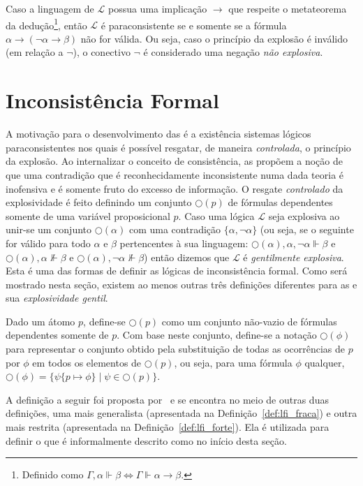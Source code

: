     Caso a linguagem de $\mathcal{L}$ possua uma implicação $\to$ que respeite o metateorema da dedução\footnote{Definido como $\Gamma, \alpha \Vdash \beta \Longleftrightarrow  \Gamma\Vdash \alpha \to \beta$.}, então $\mathcal{L}$ é paraconsistente se e somente se a fórmula $\alpha \to (\neg \alpha \to \beta)$ não for válida. Ou seja, caso o princípio da explosão é inválido (em relação a $\neg$), o conectivo $\neg$ é considerado uma negação \textit{não explosiva}.

\section{Inconsistência Formal}\label{sec:incons}
    A motivação para o desenvolvimento das \lfis{} é a existência sistemas lógicos paraconsistentes nos quais é possível resgatar, de maneira \textit{controlada}, o princípio da explosão. Ao internalizar o conceito de consistência, as \lfis{} propõem a noção de que uma contradição que é reconhecidamente inconsistente numa dada teoria é inofensiva e é somente fruto do excesso de informação. O resgate \textit{controlado} da explosividade é feito definindo um conjunto $\bigcirc(p)$ de fórmulas dependentes somente de uma variável proposicional $p$. Caso uma lógica $\mathcal{L}$ seja explosiva ao unir-se um conjunto $\bigcirc(\alpha)$ com uma contradição $\{\alpha, \neg \alpha\}$ (ou seja, se  o seguinte for válido para todo $\alpha$ e $\beta$ pertencentes à sua linguagem: $\bigcirc(\alpha), \alpha, \neg \alpha \Vdash \beta$ e $\bigcirc(\alpha), \alpha \nVdash \beta$ e $\bigcirc(\alpha), \neg \alpha \nVdash \beta$) então dizemos que $\mathcal{L}$ é \textit{gentilmente explosiva}. Esta é uma das formas de definir as lógicas de inconsistência formal. Como será mostrado nesta seção, existem ao menos outras três definições diferentes para as \lfis{} e sua \textit{explosividade gentil}.

    \begin{notacao}
        Dado um átomo $p$, define-se $\bigcirc(p)$ como um conjunto não-vazio de fórmulas dependentes somente de $p$. Com base neste conjunto, define-se a notação $\bigcirc(\phi)$ para representar o conjunto obtido pela substituição de todas as ocorrências de $p$ por $\phi$ em todos os elementos de $\bigcirc(p)$, ou seja, para uma fórmula $\phi$ qualquer, $\bigcirc(\phi) = \{\psi\{p \mapsto \phi\} \; | \; \psi \in \bigcirc(p)\}$.
    \end{notacao}


    A definição a seguir foi proposta por~ e se encontra no meio de outras duas definições, uma mais generalista (apresentada na Definição~\ref{def:lfi_fraca}) e outra mais restrita (apresentada na Definição~\ref{def:lfi_forte}). Ela é utilizada para definir o que é informalmente descrito como \lfi{} no início desta seção.

